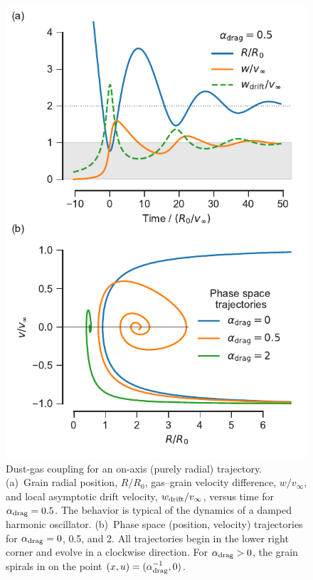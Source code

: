 \begin{figure}
  \centering
  \includegraphics[width=\linewidth]{figs/dust-coupling-1d}
  \caption{Dust-gas coupling for an on-axis (purely radial)
    trajectory.  (a)~Grain radial position, \(R/R_0\), gas--grain
    velocity difference, \(w/v_\infty\), and local asymptotic drift
    velocity, \(w_{\text{drift}}/v_\infty\), versus time for
    \(\alpha_{\text{drag}} = 0.5\).  The behavior is typical of the dynamics of a
    damped harmonic oscillator. (b)~Phase space (position, velocity)
    trajectories for \(\alpha_{\text{drag}} = 0\), 0.5, and 2. All trajectories
    begin in the lower right corner and evolve in a clockwise
    direction. For \(\alpha_{\text{drag}} > 0\), the grain spirals in on the point
    \((x, u) = (\alpha_{\text{drag}}^{-1}, 0)\).}
  \label{fig:dust-coupling-1d}
\end{figure}

